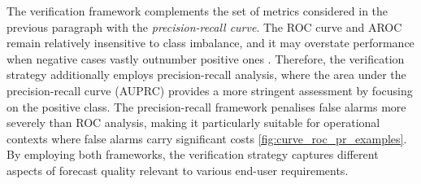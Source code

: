 The  verification framework complements the set of metrics considered in the previous paragraph with the \textit{precision-recall curve}. The ROC curve and AROC remain relatively insensitive to class imbalance, and it may overstate performance when negative cases vastly outnumber positive ones \citep{Saito_2015}. Therefore, the verification strategy additionally employs precision-recall analysis, where the area under the precision-recall curve (AUPRC) provides a more stringent assessment by focusing on the positive class. The precision-recall framework penalises false alarms more severely than ROC analysis, making it particularly suitable for operational contexts where false alarms carry significant costs \ref{fig:curve_roc_pr_examples}. By employing both frameworks, the verification strategy captures different aspects of forecast quality relevant to various end-user requirements.

